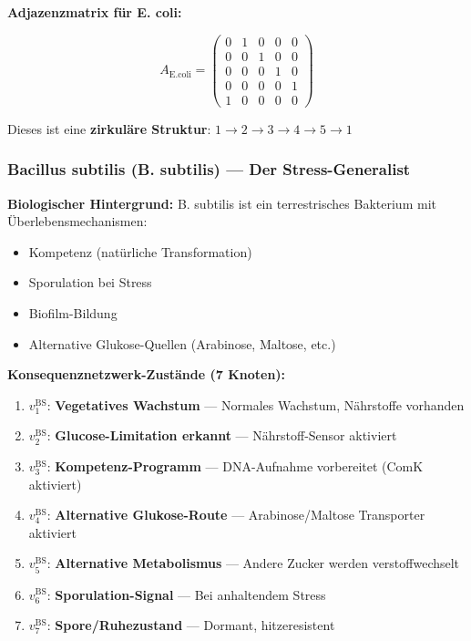 \documentclass[a4paper,12pt]{article}
\theoremstyle{definition}
\begin{document}
\textbf{Adjazenzmatrix für E. coli:}

\[
A_{\text{E.coli}} = \begin{pmatrix}
0 & 1 & 0 & 0 & 0 \\
0 & 0 & 1 & 0 & 0 \\
0 & 0 & 0 & 1 & 0 \\
0 & 0 & 0 & 0 & 1 \\
1 & 0 & 0 & 0 & 0
\end{pmatrix}
\]

Dieses ist eine \textbf{zirkuläre Struktur}: $1 \to 2 \to 3 \to 4 \to 5 \to 1$


\subsubsection*{Bacillus subtilis (B. subtilis) --- Der Stress-Generalist}

\textbf{Biologischer Hintergrund:}
B. subtilis ist ein terrestrisches Bakterium mit Überlebensmechanismen:
\begin{itemize}
    \item Kompetenz (natürliche Transformation)
    \item Sporulation bei Stress
    \item Biofilm-Bildung
    \item Alternative Glukose-Quellen (Arabinose, Maltose, etc.)
\end{itemize}

\textbf{Konsequenznetzwerk-Zustände (7 Knoten):}

\begin{enumerate}
    \item $v_1^{\text{BS}}$: \textbf{Vegetatives Wachstum} --- Normales Wachstum, Nährstoffe vorhanden
    \item $v_2^{\text{BS}}$: \textbf{Glucose-Limitation erkannt} --- Nährstoff-Sensor aktiviert
    \item $v_3^{\text{BS}}$: \textbf{Kompetenz-Programm} --- DNA-Aufnahme vorbereitet (ComK aktiviert)
    \item $v_4^{\text{BS}}$: \textbf{Alternative Glukose-Route} --- Arabinose/Maltose Transporter aktiviert
    \item $v_5^{\text{BS}}$: \textbf{Alternative Metabolismus} --- Andere Zucker werden verstoffwechselt
    \item $v_6^{\text{BS}}$: \textbf{Sporulation-Signal} --- Bei anhaltendem Stress
    \item $v_7^{\text{BS}}$: \textbf{Spore/Ruhezustand} --- Dormant, hitzeresistent
\end{enumerate}
\end{document}
